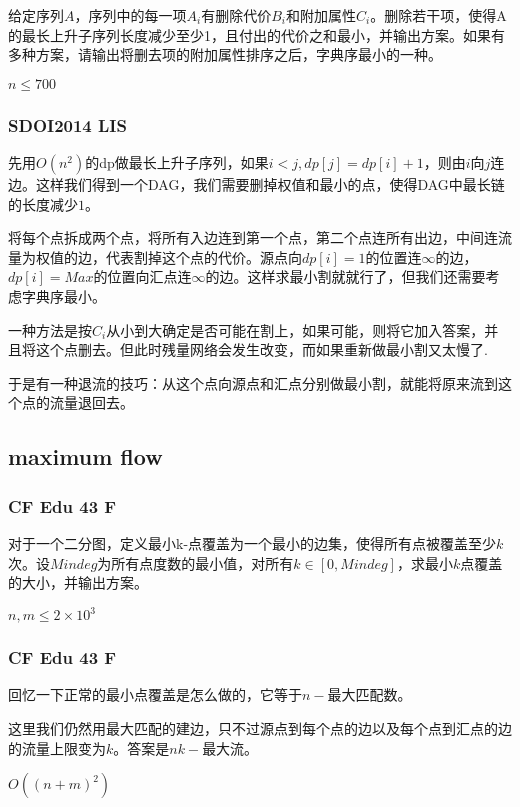\documentclass[10pt]{beamer}
\begin{document}
\begin{CJK}{UTF8}{gkai}
\begin{spacing}{1.1}
\begin{frame}
	给定序列$A$，序列中的每一项$A_i$有删除代价$B_i$和附加属性$C_i$。删除若干项，使得A的最长上升子序列长度减少至少1，且付出的代价之和最小，并输出方案。如果有多种方案，请输出将删去项的附加属性排序之后，字典序最小的一种。

	$n \le 700$

\end{frame}

\begin{frame}
\frametitle{SDOI2014 LIS}

	先用$O(n^2)$的dp做最长上升子序列，如果$i < j, dp[j] = dp[i] + 1$，则由$i$向$j$连边。这样我们得到一个DAG，我们需要删掉权值和最小的点，使得DAG中最长链的长度减少$1$。\pause

	将每个点拆成两个点，将所有入边连到第一个点，第二个点连所有出边，中间连流量为权值的边，代表割掉这个点的代价。源点向$dp[i] = 1$的位置连$\infty$的边，$dp[i] = Max$的位置向汇点连$\infty$的边。这样求最小割就就行了，但我们还需要考虑字典序最小。\pause

	一种方法是按$C_i$从小到大确定是否可能在割上，如果可能，则将它加入答案，并且将这个点删去。但此时残量网络会发生改变，而如果重新做最小割又太慢了.\pause

	于是有一种退流的技巧：从这个点向源点和汇点分别做最小割，就能将原来流到这个点的流量退回去。

\end{frame}

\subsection{maximum flow}

\begin{frame}
\frametitle{CF Edu 43 F}

	对于一个二分图，定义最小k-点覆盖为一个最小的边集，使得所有点被覆盖至少$k$次。设$Mindeg$为所有点度数的最小值，对所有$k \in [0, Mindeg]$，求最小$k$点覆盖的大小，并输出方案。

	$n, m \le 2 \times 10^3$

\end{frame}

\begin{frame}
\frametitle{CF Edu 43 F}

	回忆一下正常的最小点覆盖是怎么做的，它等于$n - $最大匹配数。\pause

	这里我们仍然用最大匹配的建边，只不过源点到每个点的边以及每个点到汇点的边的流量上限变为$k$。答案是$nk -$最大流。

	$O((n + m)^2)$


\end{frame}
\end{spacing}
\end{CJK}
\end{document}
